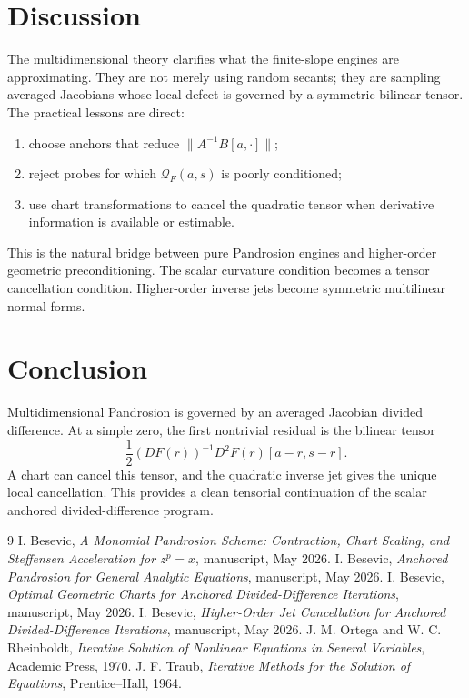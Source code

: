 \documentclass[11pt]{article}
\theoremstyle{definition}
\newcommand{\Q}{\mathcal Q}
\begin{document}
\section{Discussion}

The multidimensional theory clarifies what the finite-slope engines are approximating. They are not merely using random secants; they are sampling averaged Jacobians whose local defect is governed by a symmetric bilinear tensor. The practical lessons are direct:
\begin{enumerate}[label=(\arabic*)]
\item choose anchors that reduce $\|A^{-1}B[a,\cdot]\|$;
\item reject probes for which $\Q_F(a,s)$ is poorly conditioned;
\item use chart transformations to cancel the quadratic tensor when derivative information is available or estimable.
\end{enumerate}

This is the natural bridge between pure Pandrosion engines and higher-order geometric preconditioning. The scalar curvature condition becomes a tensor cancellation condition. Higher-order inverse jets become symmetric multilinear normal forms.

\section{Conclusion}

Multidimensional Pandrosion is governed by an averaged Jacobian divided difference. At a simple zero, the first nontrivial residual is the bilinear tensor
\[
\frac12 (DF(r))^{-1}D^2F(r)[a-r,s-r].
\]
A chart can cancel this tensor, and the quadratic inverse jet gives the unique local cancellation. This provides a clean tensorial continuation of the scalar anchored divided-difference program.

\begin{thebibliography}{9}
I. Besevic, \emph{A Monomial Pandrosion Scheme: Contraction, Chart Scaling, and Steffensen Acceleration for $z^p=x$}, manuscript, May 2026.
I. Besevic, \emph{Anchored Pandrosion for General Analytic Equations}, manuscript, May 2026.
I. Besevic, \emph{Optimal Geometric Charts for Anchored Divided-Difference Iterations}, manuscript, May 2026.
I. Besevic, \emph{Higher-Order Jet Cancellation for Anchored Divided-Difference Iterations}, manuscript, May 2026.
J. M. Ortega and W. C. Rheinboldt, \emph{Iterative Solution of Nonlinear Equations in Several Variables}, Academic Press, 1970.
J. F. Traub, \emph{Iterative Methods for the Solution of Equations}, Prentice--Hall, 1964.
\end{thebibliography}
\end{document}
